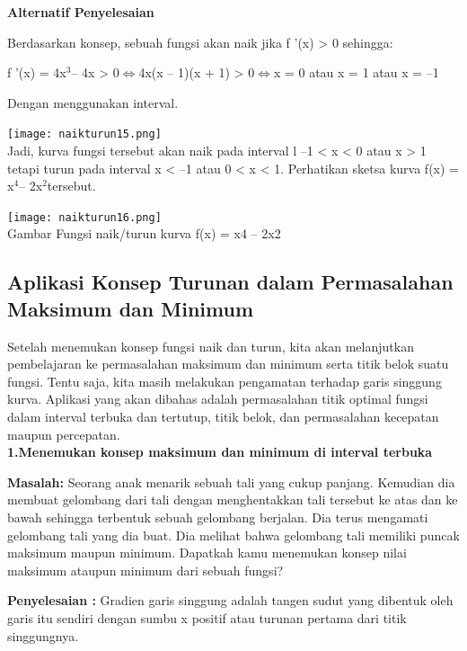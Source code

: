 \documentclass[11pt,fleqn]{book} %
\begin{document}
\textbf{Alternatif Penyelesaian}

Berdasarkan konsep, sebuah fungsi akan naik jika f '(x) > 0 sehingga:

f '(x) = 4x$^{3} $– 4x > 0$ \Leftrightarrow $4x(x – 1)(x + 1) > 0$ \Leftrightarrow $x = 0 atau x = 1 atau x = –1

Dengan menggunakan interval.

\texttt{[image: naikturun15.png]}\\

Jadi, kurva fungsi tersebut akan naik pada interval l –1 < x < 0 atau x > 1 tetapi turun pada interval x < –1 atau 0 < x < 1. Perhatikan sketsa kurva f(x) = x$^{4} $– 2x$^{2} $tersebut.\\

\begin{center}
\texttt{[image: naikturun16.png]}\\
Gambar Fungsi naik/turun kurva f(x) = x4 – 2x2
\end{center}

\subsection{Aplikasi Konsep Turunan dalam
Permasalahan Maksimum dan Minimum}

Setelah menemukan konsep fungsi naik dan turun,
kita akan melanjutkan pembelajaran ke permasalahan
maksimum dan minimum serta titik belok suatu fungsi.
Tentu saja, kita masih melakukan pengamatan terhadap
garis singgung kurva. Aplikasi yang akan dibahas adalah permasalahan titik optimal fungsi dalam interval terbuka dan tertutup, titik belok, dan permasalahan kecepatan maupun percepatan.\\

\textbf{1.Menemukan konsep maksimum dan minimum di interval terbuka}

\textbf{Masalah: }
Seorang anak menarik sebuah tali yang cukup
panjang. Kemudian dia membuat gelombang dari
tali dengan menghentakkan tali tersebut ke atas dan
ke bawah sehingga terbentuk sebuah gelombang
berjalan. Dia terus mengamati gelombang tali yang
dia buat. Dia melihat bahwa gelombang tali memiliki
puncak maksimum maupun minimum. Dapatkah
kamu menemukan konsep nilai maksimum ataupun
minimum dari sebuah fungsi?

\textbf{Penyelesaian :}
Gradien garis singgung adalah tangen sudut yang
dibentuk oleh garis itu sendiri dengan sumbu x positif atau turunan pertama dari titik singgungnya.
\end{document}
